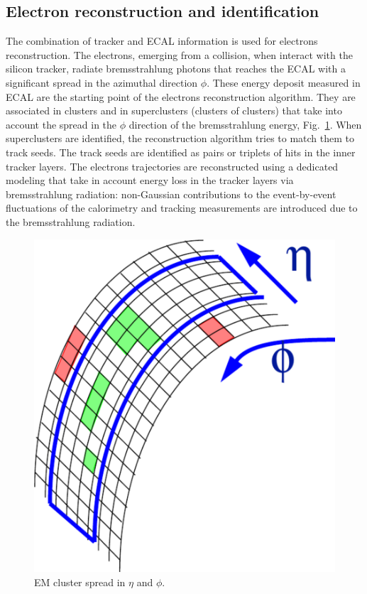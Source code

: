 \subsection*{Electron reconstruction and identification}
The combination of tracker and ECAL information is used for electrons reconstruction.
The electrons, emerging from a collision, when interact with the silicon tracker, radiate bremsstrahlung photons that reaches the ECAL with a significant spread in the azimuthal direction $\phi$. These energy deposit measured in ECAL are the starting point of the electrons reconstruction algorithm. They are associated in clusters and in superclusters (clusters of clusters) that take into account the spread in the $\phi$ direction of the bremsstrahlung energy, Fig.~\ref{clustering}.
When   superclusters are identified, the reconstruction algorithm tries to match them to track seeds. The  track seeds are identified as pairs or triplets of hits in the inner tracker layers. The electrons trajectories are reconstructed using a dedicated modeling that take in account  energy
loss in the tracker layers via  bremsstrahlung radiation: non-Gaussian contributions to the event-by-event fluctuations 
of the calorimetry and tracking measurements are introduced due to the bremsstrahlung radiation.   
\begin{figure}
\centering
\includegraphics[scale= 0.2]{../Cap4/clustering}
\caption{EM cluster spread in $\eta$ and $\phi$.}
\label{clustering}
\end{figure}

